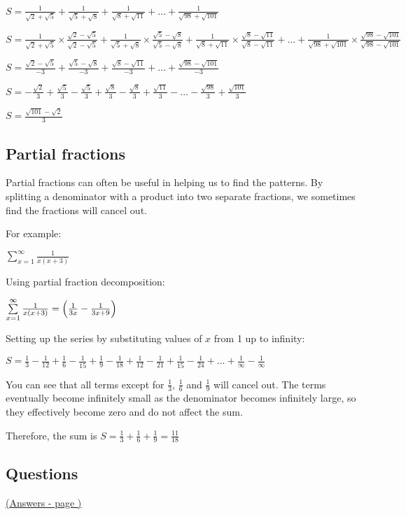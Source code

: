 \documentclass[../main.tex]{subfiles}
\begin{document}
$S=\frac{1}{\sqrt{2}+\sqrt{5}}+\frac{1}{\sqrt{5}+\sqrt{8}}+\frac{1}{\sqrt{8}+\sqrt{11}}+\dots +\frac{1}{\sqrt{98}+\sqrt{101}}$

$S=\frac{1}{\sqrt{2}+\sqrt{5}}\times \frac{\sqrt{2}-\sqrt{5}}{\sqrt{2}-\sqrt{5}}+\frac{1}{\sqrt{5}+\sqrt{8}}\times \frac{\sqrt{5}-\sqrt{8}}{\sqrt{5}-\sqrt{8}}+\frac{1}{\sqrt{8}+\sqrt{11}}\times \frac{\sqrt{8}-\sqrt{11}}{\sqrt{8}-\sqrt{11}}+\dots +\frac{1}{\sqrt{98}+\sqrt{101}}\times \frac{\sqrt{98}-\sqrt{101}}{\sqrt{98}-\sqrt{101}}$

$S=\frac{\sqrt{2}-\sqrt{5}}{-3}+\frac{\sqrt{5}-\sqrt{8}}{-3}+\frac{\sqrt{8}-\sqrt{11}}{-3}+\dots +\frac{\sqrt{98}-\sqrt{101}}{-3}$

$S=-\frac{\sqrt{2}}{3}+\frac{\sqrt{5}}{3}-\frac{\sqrt{5}}{3}+\frac{\sqrt{8}}{3}-\frac{\sqrt{8}}{3}+\frac{\sqrt{11}}{3}-\dots -\frac{\sqrt{98}}{3}+\frac{\sqrt{101}}{3}$

$S=\frac{\sqrt{101}-\sqrt{2}}{3}$

\subsection*{Partial fractions}
Partial fractions can often be useful in helping us to find the patterns. By splitting a denominator with a product into two separate fractions, we sometimes find the fractions will cancel out.

For example:

\(\sum\limits_{x=1}^\infty \frac{1}{x(x+3)}\)

Using partial fraction decomposition:

\(\sum\limits_{x=1}^\infty \frac{1}{x(x+3)}=\Bigl(\frac{1}{3x}-\frac{1}{3x+9}\Bigr)\)

Setting up the series by substituting values of $x$ from 1 up to infinity:

$S=\frac{1}{3}-\frac{1}{12}+\frac{1}{6}-\frac{1}{15}+\frac{1}{9}-\frac{1}{18}+\frac{1}{12}-\frac{1}{21}+\frac{1}{15}-\frac{1}{24}+\dots +\frac{1}{\infty}-\frac{1}{\infty}$

You can see that all terms except for $\frac{1}{3}$, $\frac{1}{6}$ and $\frac{1}{9}$ will cancel out. The terms eventually become infinitely small as the denominator becomes infinitely large, so they effectively become zero and do not affect the sum.

Therefore, the sum is $S=\frac{1}{3}+\frac{1}{6}+\frac{1}{9}=\frac{11}{18}$

\pagebreak
\hypertarget{telescopingsumslink}{\subsection*{Questions}}
\hyperlink{telescopingsumsanswers}{(Answers - page {\pageref*{Telescoping sums answers}})}
\end{document}
